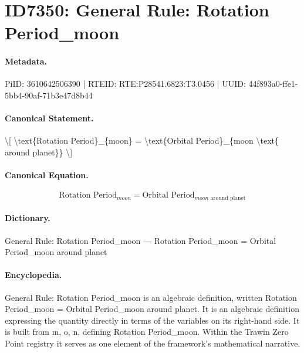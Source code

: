 \section*{ID7350: General Rule: Rotation Period\_moon}
\paragraph{Metadata.}
PiID: 3610642506390 | RTEID: RTE:P28541.6823:T3.0456 | UUID: 44f893a0-ffe1-5bb4-90af-71b3e47d8b44

\paragraph{Canonical Statement.}
\textbackslash{}[ \textbackslash{}text\{Rotation Period\}\_\{moon\} = \textbackslash{}text\{Orbital Period\}\_\{moon \textbackslash{}text\{ around planet\}\} \textbackslash{}]

\paragraph{Canonical Equation.}
\[
\text{Rotation Period}_{moon} = \text{Orbital Period}_{moon \text{ around planet}}
\]

\paragraph{Dictionary.}
General Rule: Rotation Period\_moon — Rotation Period\_moon = Orbital Period\_moon around planet

\paragraph{Encyclopedia.}
General Rule: Rotation Period\_moon is an algebraic definition, written Rotation Period\_moon = Orbital Period\_moon around planet. It is an algebraic definition expressing the quantity directly in terms of the variables on its right-hand side. It is built from m, o, n, defining Rotation Period\_moon. Within the Trawin Zero Point registry it serves as one element of the framework's mathematical narrative.
